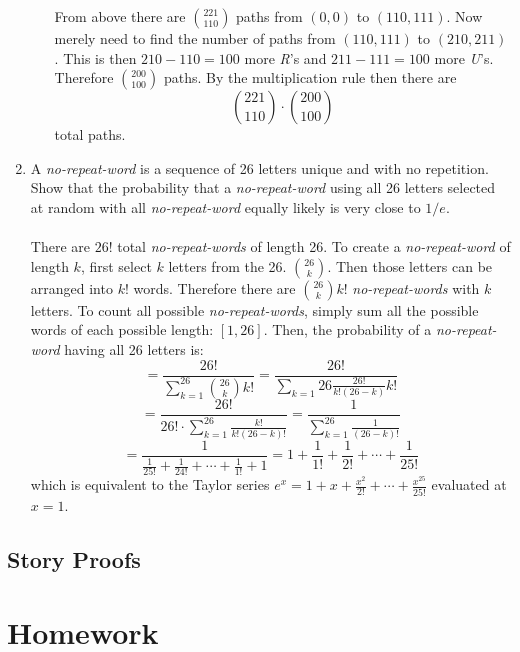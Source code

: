\documentclass[11pt, oneside]{article}   	%
\begin{document}
\begin{enumerate}
\begin{enumerate}
				From above there are $\binom{221}{110}$ paths from $(0, 0)$ to $(110, 111)$. Now merely need to find the number of paths from $(110, 111)$ to $(210, 211)$. This is then $210 - 110 = 100$ more \textit{R}'s and $211 - 111 = 100$ more \textit{U}'s.
				Therefore $\binom{200}{100}$ paths. By the multiplication rule then there are \[ \binom{221}{110} \cdot \binom{200}{100} \] total paths.
			\end{enumerate}
		\item A \textit{no-repeat-word} is a sequence of 26 letters unique and with no repetition. Show that the probability that a \textit{no-repeat-word} using all 26 letters selected at random with all \textit{no-repeat-word}  equally likely is very close to $1/e$. \\\\
			There are $26!$ total \textit{no-repeat-words} of length 26. To create a \textit{no-repeat-word} of length $k$, first select $k$ letters from the 26. $\binom{26}{k}$. Then those letters can be arranged into $k!$ words. Therefore there are $\binom{26}{k}k!$
			\textit{no-repeat-words} with $k$ letters. To count all possible \textit{no-repeat-words}, simply sum all the possible words of each possible length: $[1, 26]$. Then, the probability of a \textit{no-repeat-word} having all 26 letters is:
			\[ 
				= \frac{26!}{\sum_{k=1}^{26} \binom{26}{k} k!} = \frac{26!}{\sum_{k=1}{26} \frac{26!}{k!(26-k)} k!}
			\]
			\[
				= \frac{26!}{26! \cdot \sum_{k=1}^{26} \frac{k!}{k!(26-k)!} } = \frac{1}{\sum_{k=1}^{26} \frac{1}{(26-k)!}}
			\]
			\[
				= \frac{1}{ \frac{1}{25!} + \frac{1}{24!} + \cdots + \frac{1}{1!} + 1} = 1 + \frac{1}{1!} + \frac{1}{2!} + \cdots + \frac{1}{25!}
			\]
			which is equivalent to the Taylor series $e^x = 1 + x + \frac{x^2}{2!} + \cdots + \frac{x^{25}}{25!}$ evaluated at $x=1$.
	\end{enumerate}

\subsection{Story Proofs}

\pagebreak
\section{Homework}
\end{document}
